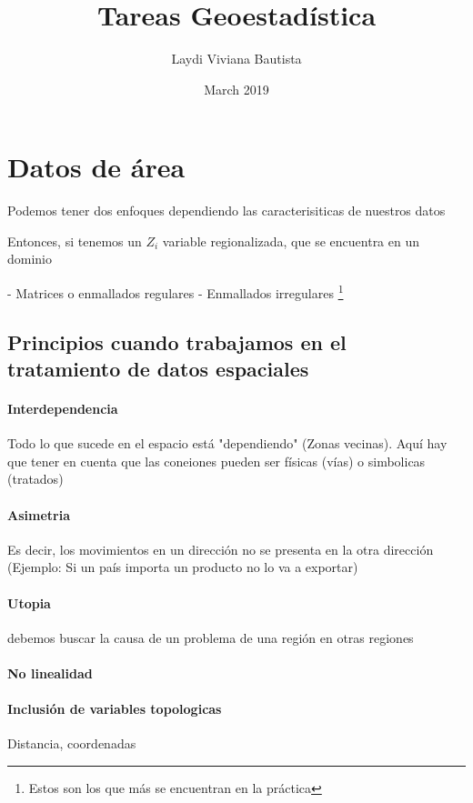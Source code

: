 \documentclass{article}
\title{Tareas Geoestadística}
\author{Laydi Viviana Bautista}
\date{March 2019}
\begin{document}
\section{Datos de área}

Podemos tener dos enfoques dependiendo las caracterisiticas de nuestros datos

Entonces, si tenemos un $Z_i$ variable regionalizada, que se encuentra en un dominio

- Matrices o enmallados regulares
- Enmallados irregulares \footnote{Estos son los que más se encuentran en la práctica}


\subsection{Principios cuando trabajamos en el tratamiento de datos espaciales}

\paragraph{Interdependencia} Todo lo que sucede en el espacio está "dependiendo" (Zonas vecinas). Aquí hay que tener en cuenta que las coneiones pueden ser físicas (vías) o simbolicas (tratados)

\paragraph{Asimetria} Es decir, los movimientos en un dirección no se presenta en la otra dirección (Ejemplo: Si un país importa un producto no lo va a exportar)

\paragraph{Utopia}debemos buscar la causa de un problema de una región en otras regiones

\paragraph{No linealidad} 

\paragraph{Inclusión de variables topologicas} Distancia, coordenadas
\end{document}
